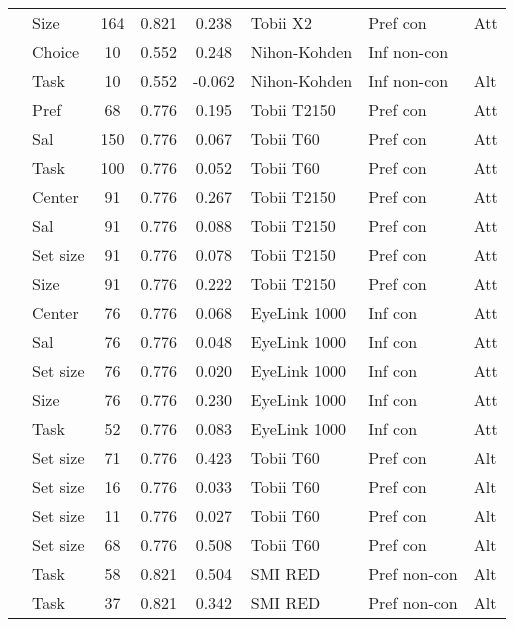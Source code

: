 \begin{longtable}{p{5cm}lccclll}
  \cite{neuhofer2020} & Size & 164 & 0.821 & 0.238 & Tobii X2 & Pref con & Att \\ 
  \cite{nittono2009} & Choice & 10 & 0.552 & 0.248 & Nihon-Kohden & Inf non-con &  \\ 
  \cite{nittono2009} & Task & 10 & 0.552 & -0.062 & Nihon-Kohden & Inf non-con & Alt \\ 
  \cite{orquin2013} & Pref & 68 & 0.776 & 0.195 & Tobii T2150 & Pref con & Att \\ 
  \cite{orquin2015a} & Sal & 150 & 0.776 & 0.067 & Tobii T60 & Pref con & Att \\ 
  \cite{orquin2015a} & Task & 100 & 0.776 & 0.052 & Tobii T60 & Pref con & Att \\ 
  \cite{orquin2019a} & Center & 91 & 0.776 & 0.267 & Tobii T2150 & Pref con & Att \\ 
  \cite{orquin2019a} & Sal & 91 & 0.776 & 0.088 & Tobii T2150 & Pref con & Att \\ 
  \cite{orquin2019a} & Set size & 91 & 0.776 & 0.078 & Tobii T2150 & Pref con & Att \\ 
  \cite{orquin2019a} & Size & 91 & 0.776 & 0.222 & Tobii T2150 & Pref con & Att \\ 
  \cite{orquin2019a} & Center & 76 & 0.776 & 0.068 & EyeLink 1000 & Inf con & Att \\ 
  \cite{orquin2019a} & Sal & 76 & 0.776 & 0.048 & EyeLink 1000 & Inf con & Att \\ 
  \cite{orquin2019a} & Set size & 76 & 0.776 & 0.020 & EyeLink 1000 & Inf con & Att \\ 
  \cite{orquin2019a} & Size & 76 & 0.776 & 0.230 & EyeLink 1000 & Inf con & Att \\ 
  \cite{orquin2019a} & Task & 52 & 0.776 & 0.083 & EyeLink 1000 & Inf con & Att \\ 
  \cite{orquin2020osfb} & Set size & 71 & 0.776 & 0.423 & Tobii T60 & Pref con & Alt \\ 
  \cite{orquin2020osfb} & Set size & 16 & 0.776 & 0.033 & Tobii T60 & Pref con & Alt \\ 
  \cite{orquin2020osfb} & Set size & 11 & 0.776 & 0.027 & Tobii T60 & Pref con & Alt \\ 
  \cite{orquin2020osfb} & Set size & 68 & 0.776 & 0.508 & Tobii T60 & Pref con & Alt \\ 
  \cite{paernamets2015a} & Task & 58 & 0.821 & 0.504 & SMI RED & Pref non-con & Alt \\ 
  \cite{paernamets2015a} & Task & 37 & 0.821 & 0.342 & SMI RED & Pref non-con & Alt \\ 

\end{longtable}
